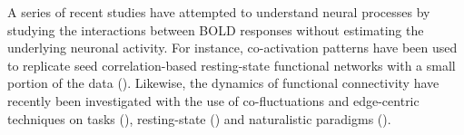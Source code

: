 A series of recent studies have attempted to understand neural processes by studying the interactions between BOLD responses without estimating the underlying neuronal activity. For instance, co-activation patterns have been used to replicate seed correlation-based resting-state functional networks with a small portion of the data (\citealt{Liu2013Timevaryingfunctional,Liu2013Decompositionspontaneousbrain,Liu2018Coactivationpatterns,Majeed2009Spatiotemporaldynamicslow,Majeed2011Spatiotemporaldynamicslow,cifre2020revisiting,Cifre2020Furtherresultswhy,Zhang2020relationshipBOLDneural}). Likewise, the dynamics of functional connectivity have recently been investigated with the use of co-fluctuations and edge-centric techniques on tasks (\citealt{Faskowitz2021edgecentricmodel}), resting-state (\citealt{Esfahlani2020Highamplitudecofluctuations}) and naturalistic paradigms (\citealt{Faskowitz2020Edgecentricfunctional,Betzel2020Temporalfluctuationsbrains}). %